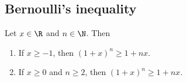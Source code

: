 \subsection{Bernoulli's inequality}
\begin{proposition}
    Let $x \in \R$ and $n \in \N$. Then
    \begin{enumerate}
        \item If $x \ge -1$, then $(1 + x)^n \ge 1 + nx$.
        \item If $x \ge 0$ and $n \ge 2$, then $(1 + x)^n \ge 1 + nx$.
    \end{enumerate}
\end{proposition}
